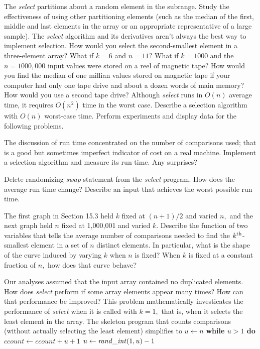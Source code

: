 \prob
The {\it select} partitions about a random element in the subrange. Study the
effectiveness of using other partitioning elements (such as the median of the
first, middle and last elements in the array or an appropriate representative
of a large sample).
\prob
The {\it select} algorithm and its derivatives aren't always the best way to
implement selection. How would you select the second-smallest element in a
three-element array? What if $k=6$ and $n=11?$ What if $k=1000$ and the $n=
1000{,}000$ input values were stored on a reel of magnetic tape?
\prob
How would you find the median of one millian values stored on magnetic tape if
your computer had only one tape drive and about a dozen words of main memory?
How would you use a second tape drive?
\prob
Although {\it select} runs in $O(n)$ average time, it requires $O(n^2)$ time in
the worst case. Describe a selection algorithm with $O(n)$ worst-case time.
\prob
Perform experiments and display data for the following problems.

 The discussion of run time concentrated on the number of
comparisons used; that is a good but sometimes imperfect indicator of cost on a
real machine. Implement a selection algorithm and measure its run time. Any
surprises?

 Delete randomizing {\it swap\/} statement from the {\it select}
program. How does the average run time change? Describe an input that achieves
the worst possible run time.

 The first graph in Section 15.3 held $k$ fixed at $(n+1)/2$ and
varied $n,$ and the next graph held $n$ fixed at 1{,}000{,}001 and varied $k.$
Describe the function of two variables that tells the average number of
comparisons needed to find the $k^{\rm th}$-smallest element in a set of $n$
distinct elements. In particular, what is the shape of the curve induced by
varying $k$ when $n$ is fixed? When $k$ is fixed at a constant fraction of $n,$
how does that curve behave?

 Our analyses assumed that the input array contained no duplicated
elements. How does {\it select} perform if some array elements appear many
times? How can that performance be improved?
\prob
This problem mathematically investicates the performance of {\it select} when
it is called with $k=1,$ that is, when it selects the least element in the
array. The skeleton program that counts comparisons (without actually selecting
the least element) simplifies to
\begindisplay
\vbox{
\+$u\leftarrow n$\cr
\+\bf while $u>1$ do\cr
\+\quad$ccount\leftarrow ccount+u+1$\cr
\+\quad$u\leftarrow {\it rand\_int}(1,u)-1$\cr}
\enddisplay

